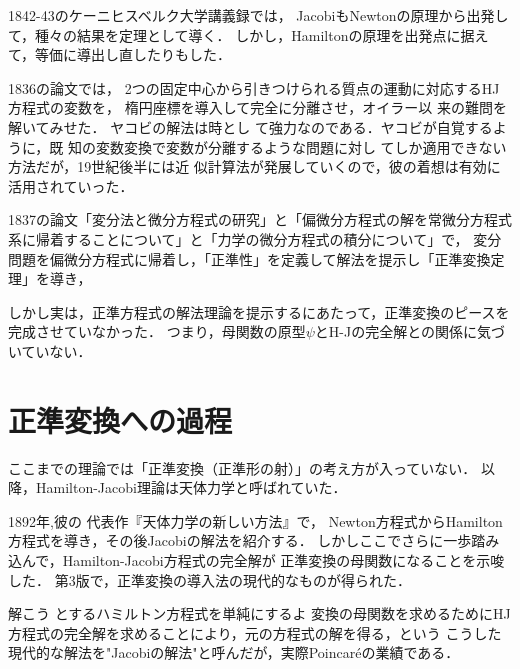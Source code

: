 \documentclass[uplatex,dvipdfmx]{jsreport}
\begin{document}
\begin{history}
    1842-43のケーニヒスベルク大学講義録では，
    JacobiもNewtonの原理から出発して，種々の結果を定理として導く．
    しかし，Hamiltonの原理を出発点に据えて，等価に導出し直したりもした．

    1836の論文\cite{Jacobi36}では，
    2つの固定中心から引きつけられる質点の運動に対応するHJ方程式の変数を，
    楕円座標を導入して完全に分離させ，オイラー以
    来の難問を解いてみせた．
    ヤコビの解法は時とし
    て強力なのである．ヤコビが自覚するように，既
    知の変数変換で変数が分離するような問題に対し
    てしか適用できない方法だが，19世紀後半には近
    似計算法が発展していくので，彼の着想は有効に
    活用されていった．

    1837の論文\cite{Jacobi37}「変分法と微分方程式の研究」と「偏微分方程式の解を常微分方程式系に帰着することについて」と「力学の微分方程式の積分について」で，
    変分問題を偏微分方程式に帰着し，「正準性」を定義して解法を提示し「正準変換定理」を導き，
\end{history}

\begin{remarks}
    しかし実は，正準方程式の解法理論を提示するにあたって，正準変換のピースを完成させていなかった．
    つまり，母関数の原型$\psi$とH-Jの完全解との関係に気づいていない．
\end{remarks}

\begin{theorem}
    
\end{theorem}

\section{正準変換への過程}

\begin{tcolorbox}[colframe=ForestGreen, colback=ForestGreen!10!white,breakable,colbacktitle=ForestGreen!40!white,coltitle=black,fonttitle=\bfseries\sffamily,
title=]
    ここまでの理論では「正準変換（正準形の射）」の考え方が入っていない．
    以降，Hamilton-Jacobi理論は天体力学と呼ばれていた．
\end{tcolorbox}

\begin{history}
    1892年,彼の
    代表作『天体力学の新しい方法』で，
    Newton方程式からHamilton方程式を導き，その後Jacobiの解法を紹介する．
    しかしここでさらに一歩踏み込んで，Hamilton-Jacobi方程式の完全解が
    正準変換の母関数になることを示唆した．
    第3版で，正準変換の導入法の現代的なものが得られた．

    解こう
とするハミルトン方程式を単純にするよ
変換の母関数を求めるためにHJ方程式の完全解を求めることにより，元の方程式の解を得る，という
    こうした現代的な解法を"Jacobiの解法"と呼んだが，実際Poincaréの業績である．
\end{history}
\end{document}
